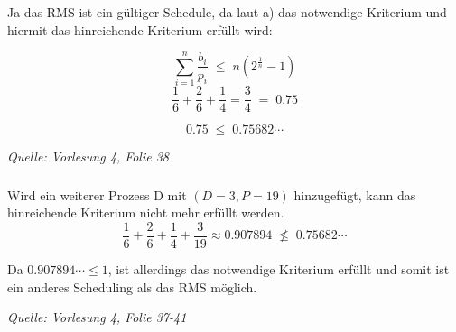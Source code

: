 \documentclass[a4paper]{article}
\newenvironment{quelle}{\medskip \noindent\itshape Quelle: }{\medskip}
\begin{document}
\subsubsection{}
Ja das RMS ist ein gültiger Schedule, da laut a) das notwendige Kriterium und hiermit das hinreichende Kriterium erfüllt wird:

\[ \sum \limits_{i=1}^n \frac{b_i}{p_i} \;\le\; n (2^{\frac{1}{n}} - 1) \]
\[ \frac{1}{6} + \frac{2}{6} + \frac{1}{4} = \frac{3}{4} \; = \; 0.75 \]

\[ 0.75 \; \le \; 0.75682\cdots\]

\begin{quelle}
  Vorlesung 4, Folie 38
\end{quelle}

\subsubsection{}
Wird ein weiterer Prozess D mit $(D=3, P=19)$ hinzugefügt, kann das hinreichende Kriterium nicht mehr erfüllt werden.
\[ \frac{1}{6} + \frac{2}{6} + \frac{1}{4} + \frac{3}{19} \approx 0.907894 \; \not\leq \; 0.75682\cdots\]

Da $0.907894\cdots \le 1$, ist allerdings das notwendige Kriterium erfüllt und somit ist ein anderes Scheduling als das RMS möglich. 

\begin{quelle}
  Vorlesung 4, Folie 37-41
\end{quelle}
\end{document}
